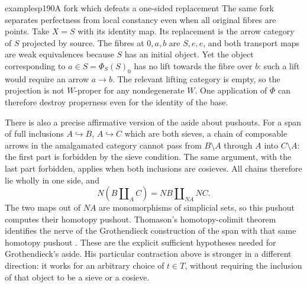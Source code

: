 \begin{dcomment}{examples}{p190}{A fork which defeats a one-sided replacement}
The same fork separates perfectness from local constancy even when all original fibres are points. Take $X=S$ with its identity map. Its replacement is the arrow category of $S$ projected by source. The fibres at $0,a,b$ are $S,e,e$, and both transport maps are weak equivalences because $S$ has an initial object. Yet the object corresponding to $a\in S=\Phi_S(S)_0$ has no lift towards the fibre over $b$: such a lift would require an arrow $a\to b$. The relevant lifting category is empty, so the projection is not $W$-proper for any nondegenerate $W$. One application of $\Phi$ can therefore destroy properness even for the identity of the base.

There is also a precise affirmative version of the aside about pushouts. For a span of full inclusions $A\hookrightarrow B$, $A\hookrightarrow C$ which are both sieves, a chain of composable arrows in the amalgamated category cannot pass from $B\setminus A$ through $A$ into $C\setminus A$: the first part is forbidden by the sieve condition. The same argument, with the last part forbidden, applies when both inclusions are cosieves. All chains therefore lie wholly in one side, and
\[
N(B\amalg_A C)=NB\amalg_{NA}NC.
\]
The two maps out of $NA$ are monomorphisms of simplicial sets, so this pushout computes their homotopy pushout. Thomason's homotopy-colimit theorem identifies the nerve of the Grothendieck construction of the span with that same homotopy pushout \citep[Theorem~1.2]{Thomason1979}. These are the explicit sufficient hypotheses needed for Grothendieck's aside. His particular contraction above is stronger in a different direction: it works for an arbitrary choice of $t\in T$, without requiring the inclusion of that object to be a sieve or a cosieve.
\end{dcomment}

